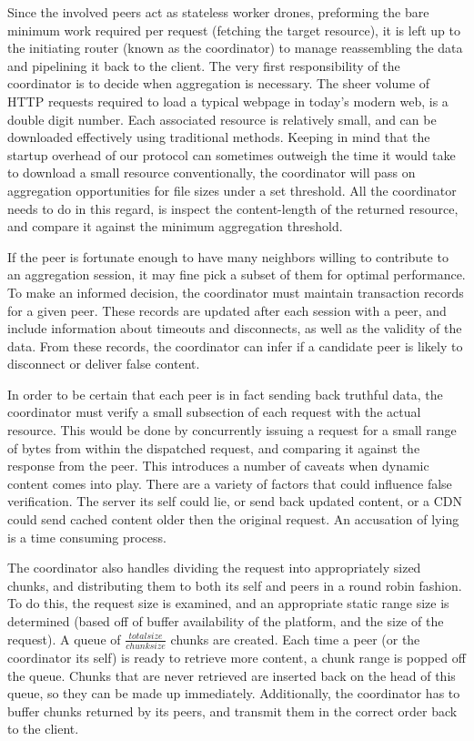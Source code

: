 \documentclass[12pt]{article}
\begin{document}
			Since the involved peers act as stateless worker drones, preforming the bare minimum work required per request (fetching the target resource), it is left up to the initiating router (known as the coordinator) to manage reassembling the data and pipelining it back to the client. The very first responsibility of the coordinator is to decide when aggregation is necessary. The sheer volume of HTTP requests required to load a typical webpage in today's modern web, is a double digit number. Each associated resource is relatively small, and can be downloaded effectively using traditional methods. Keeping in mind that the startup overhead of our protocol can sometimes outweigh the time it would take to download a small resource conventionally, the coordinator will pass on aggregation opportunities for file sizes under a set threshold. All the coordinator needs to do in this regard, is inspect the content-length of the returned resource, and compare it against the minimum aggregation threshold.

			If the peer is fortunate enough to have many neighbors willing to contribute to an aggregation session, it may fine pick a subset of them for optimal performance. To make an informed decision, the coordinator must maintain transaction records for a given peer. These records are updated after each session with a peer, and include information about timeouts and disconnects, as well as the validity of the data. From these records, the coordinator can infer if a candidate peer is likely to disconnect or deliver false content.

			In order to be certain that each peer is in fact sending back truthful data, the coordinator must verify a small subsection of each request with the actual resource. This would be done by concurrently issuing a request for a small range of bytes from within the dispatched request, and comparing it against the response from the peer. This introduces a number of caveats when dynamic content comes into play. There are a variety of factors that could influence false verification. The server its self could lie, or send back updated content, or a CDN could send cached content older then the original request. An accusation of lying is a time consuming process. 

			The coordinator also handles dividing the request into appropriately sized chunks, and distributing them to both its self and peers in a round robin fashion. To do this, the request size is examined, and an appropriate static range size is determined (based off of buffer availability of the platform, and the size of the request). A queue of $\frac{total size}{chunk size}$ chunks are created. Each time a peer (or the coordinator its self) is ready to retrieve more content, a chunk range is popped off the queue. Chunks that are never retrieved are inserted back on the head of this queue, so they can be made up immediately. Additionally, the coordinator has to buffer chunks returned by its peers, and transmit them in the correct order back to the client. 
\end{document}
